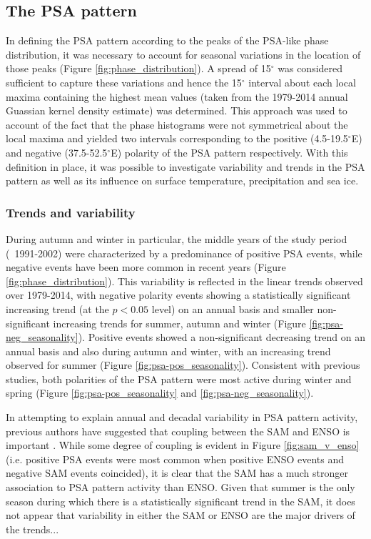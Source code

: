 \subsection{The PSA pattern}

In defining the PSA pattern according to the peaks of the PSA-like phase distribution, it was necessary to account for seasonal variations in the location of those peaks (Figure \ref{fig:phase_distribution}). A spread of 15$^{\circ}$ was considered sufficient to capture these variations and hence the 15$^{\circ}$ interval about each local maxima containing the highest mean values (taken from the 1979-2014 annual Guassian kernel density estimate) was determined. This approach was used to account of the fact that the phase histograms were not symmetrical about the local maxima and yielded two intervals corresponding to the positive (4.5-19.5$^{\circ}$E) and negative (37.5-52.5$^{\circ}$E) polarity of the PSA pattern respectively. With this definition in place, it was possible to investigate variability and trends in the PSA pattern as well as its influence on surface temperature, precipitation and sea ice. 

\subsubsection{Trends and variability}

During autumn and winter in particular, the middle years of the study period (~1991-2002) were characterized by a predominance of positive PSA events, while negative events have been more common in recent years (Figure \ref{fig:phase_distribution}). This variability is reflected in the linear trends observed over 1979-2014, with negative polarity events showing a statistically significant increasing trend (at the $p < 0.05$ level) on an annual basis and smaller non-significant increasing trends for summer, autumn and winter (Figure \ref{fig:psa-neg_seasonality}). Positive events showed a non-significant decreasing trend on an annual basis and also during autumn and winter, with an increasing trend observed for summer (Figure \ref{fig:psa-pos_seasonality}). Consistent with previous studies, both polarities of the PSA pattern were most active during winter and spring (Figure \ref{fig:psa-pos_seasonality} and \ref{fig:psa-neg_seasonality}). 

In attempting to explain annual and decadal variability in PSA pattern activity, previous authors have suggested that coupling between the SAM and ENSO is important \citep[e.g.][]{Fogt2006}. While some degree of coupling is evident in Figure \ref{fig:sam_v_enso} (i.e. positive PSA events were most common when positive ENSO events and negative SAM events coincided), it is clear that the SAM has a much stronger association to PSA pattern activity than ENSO. Given that summer is the only season during which there is a statistically significant trend in the SAM, it does not appear that variability in either the SAM or ENSO are the major drivers of the trends...



